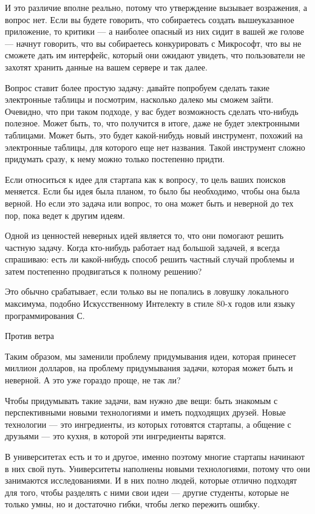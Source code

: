 \documentclass[ebook,12pt,oneside,openany]{memoir}
\begin{document}
И это различие вполне реально, потому что утверждение вызывает
возражения, а вопрос нет. Если вы будете говорить, что собираетесь
создать вышеуказанное приложение, то критики — а наиболее опасный из
них сидит в вашей же голове — начнут говорить, что вы собираетесь
конкурировать с Микрософт, что вы не сможете дать им интерфейс,
который они ожидают увидеть, что пользователи не захотят хранить
данные на вашем сервере и так далее.

Вопрос ставит более простую задачу: давайте попробуем сделать такие
электронные таблицы и посмотрим, насколько далеко мы сможем зайти.
Очевидно, что при таком подходе, у вас будет возможность сделать
что-нибудь полезное. Может быть, то, что получится в итоге, даже не
будет электронными таблицами. Может быть, это будет какой-нибудь новый
инструмент, похожий на электронные таблицы, для которого еще нет
названия. Такой инструмент сложно придумать сразу, к нему можно только
постепенно придти.

Если относиться к идее для стартапа как к вопросу, то цель ваших
поисков меняется. Если бы идея была планом, то было бы необходимо,
чтобы она была верной. Но если это задача или вопрос, то она может
быть и неверной до тех пор, пока ведет к другим идеям.

Одной из ценностей неверных идей является то, что они помогают решить
частную задачу. Когда кто-нибудь работает над большой задачей, я
всегда спрашиваю: есть ли какой-нибудь способ решить частный случай
проблемы и затем постепенно продвигаться к полному решению?

Это обычно срабатывает, если только вы не попались в ловушку
локального максимума, подобно Искусственному Интелекту в стиле 80-х
годов или языку программирования С.

Против ветра

Таким образом, мы заменили проблему придумывания идеи, которая
принесет миллион долларов, на проблему придумывания задачи, которая
может быть и неверной. А это уже гораздо проще, не так ли?

Чтобы придумывать такие задачи, вам нужно две вещи: быть знакомым с
перспективными новыми технологиями и иметь подходящих друзей. Новые
технологии — это ингредиенты, из которых готовятся стартапы, а общение
с друзьями — это кухня, в которой эти ингредиенты варятся.

В университетах есть и то и другое, именно поэтому многие стартапы
начинают в них свой путь. Университеты наполнены новыми технологиями,
потому что они занимаются исследованиями. И в них полно людей, которые
отлично подходят для того, чтобы разделять с ними свои идеи — другие
студенты, которые не только умны, но и достаточно гибки, чтобы легко
пережить ошибку.
\end{document}
